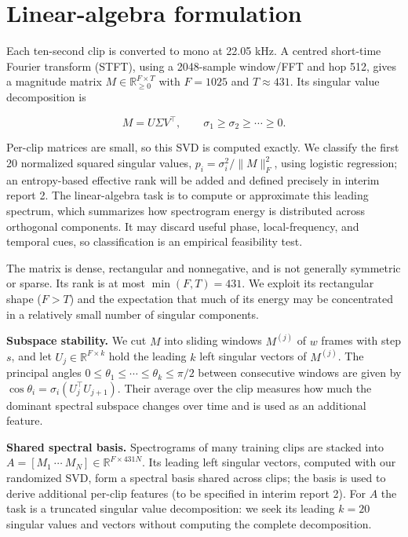 \documentclass[11pt,a4paper]{article}
\theoremstyle{plain}
\theoremstyle{definition}
\theoremstyle{remark}
\begin{document}
\section{Linear-algebra formulation}
Each ten-second clip is converted to mono at 22.05 kHz. A centred short-time
Fourier transform (STFT), using a 2048-sample window/FFT and hop 512, gives a
magnitude matrix $M\in\mathbb{R}_{\geq0}^{F\times T}$ with $F=1025$ and
$T\approx431$. Its singular value decomposition is

$$
  M=U\Sigma V^\top,\qquad \sigma_1\geq\sigma_2\geq\cdots\geq0.
$$

Per-clip matrices are small, so this SVD is computed exactly. We classify the
first 20 normalized squared singular values, $p_i=\sigma_i^2/\|M\|_F^2$, using
logistic regression; an entropy-based effective rank will be added and defined
precisely in interim report 2. The linear-algebra task
is to compute or approximate this leading spectrum, which summarizes how
spectrogram energy is distributed across orthogonal components. It may discard
useful phase, local-frequency, and temporal cues, so classification is an
empirical feasibility test.

The matrix is dense, rectangular and nonnegative, and is not generally
symmetric or sparse. Its rank is at most $\min(F,T)=431$.
We exploit its rectangular shape ($F>T$) and the expectation that much of
its energy may be concentrated in a relatively small number of singular
components.

\textbf{Subspace stability.} We cut $M$ into sliding windows $M^{(j)}$ of $w$
frames with step $s$, and let $U_j\in\mathbb{R}^{F\times k}$ hold the leading $k$
left singular vectors of $M^{(j)}$. The principal angles
$0\leq\theta_1\leq\cdots\leq\theta_k\leq\pi/2$ between consecutive windows are
given by $\cos\theta_i=\sigma_i(U_j^\top U_{j+1})$. Their average over the clip
measures how much the dominant spectral subspace changes over time and is used
as an additional feature.

\textbf{Shared spectral basis.} Spectrograms of many training clips are stacked
into $A=[M_1\ \cdots\ M_N]\in\mathbb{R}^{F\times431N}$. Its leading left singular
vectors, computed with our randomized SVD, form a spectral basis shared across
clips; the basis is used to derive additional per-clip features (to be specified
in interim report 2). For $A$ the task is a
truncated singular value decomposition: we seek its leading $k=20$ singular
values and vectors without computing the complete decomposition.
\end{document}
